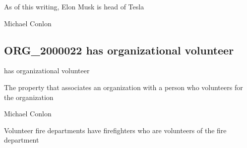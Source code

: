 \documentclass[letterpaper,10pt,english]{sphinxmanual}
\begin{document}
\begin{sphinxShadowBox}

\sphinxAtStartPar
As of this writing, Elon Musk is head of Tesla
\end{sphinxShadowBox}

\begin{sphinxShadowBox}

\sphinxAtStartPar
Michael Conlon 
\end{sphinxShadowBox}
\begin{quote}

\ignorespaces \end{quote}


\subsection{ORG\_2000022 \sphinxhyphen{} has organizational volunteer}
\label{\detokenize{doc-ORG_2000022:org-2000022-has-organizational-volunteer}}\label{\detokenize{doc-ORG_2000022:index-0}}\label{\detokenize{doc-ORG_2000022::doc}}
\begin{sphinxShadowBox}

\sphinxAtStartPar
has organizational volunteer
\end{sphinxShadowBox}

\begin{sphinxShadowBox}

\sphinxAtStartPar
The property that associates an organization with a person who volunteers for the organization
\end{sphinxShadowBox}

\begin{sphinxShadowBox}

\sphinxAtStartPar
Michael Conlon 
\end{sphinxShadowBox}

\begin{sphinxShadowBox}

\sphinxAtStartPar
Volunteer fire departments have firefighters who are volunteers of the fire department
\end{sphinxShadowBox}
\end{document}
